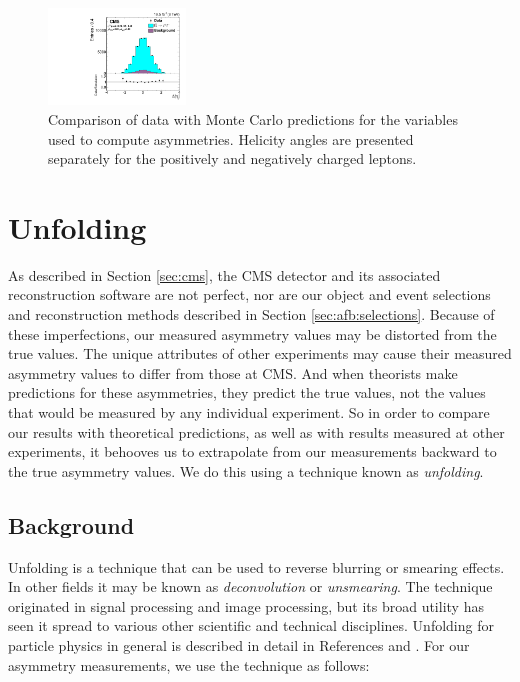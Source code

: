 \begin{figure}[phtb]
  \includegraphics[width=0.325\textwidth]{figures/dataMC_lep_charge_asymmetry_combined.pdf}
  \caption{Comparison of data with Monte Carlo predictions for the
    variables used to compute asymmetries. Helicity angles are
    presented separately for the positively and negatively charged leptons.}
  \label{fig:afb:datamcasymvars}
\end{figure}

\section{Unfolding}
\label{sec:afb:unfolding}

As described in Section \ref{sec:cms}, the CMS detector and its
associated reconstruction software are not perfect, nor are our object
and event selections and reconstruction methods described in Section
\ref{sec:afb:selections}. Because of these imperfections, our measured
asymmetry values may be distorted from the true values.
The unique attributes of other experiments may cause their measured
asymmetry values to differ from those at CMS. And
when theorists make predictions for these asymmetries,
they predict the true values, not the values that would be measured by any
individual experiment. So in order to compare our results with
theoretical predictions, as well as with results measured at other
experiments, it behooves us to extrapolate from our measurements
backward to the true asymmetry values. We do this using a
technique known as \emph{unfolding}.

\subsection{Background}
\label{ssec:afb:unfoldingbkg}

Unfolding is a technique that can be used to reverse blurring or
smearing effects. In other fields it may be known as
\emph{deconvolution} or \emph{unsmearing}. The technique originated in
signal processing and image processing, but its broad utility has seen
it spread to various other scientific and technical
disciplines. Unfolding for particle physics in general is described in detail in
References \cite{unfoldingcowan} and \cite{blobelseminar}. For our
asymmetry measurements, we use the technique as follows:

